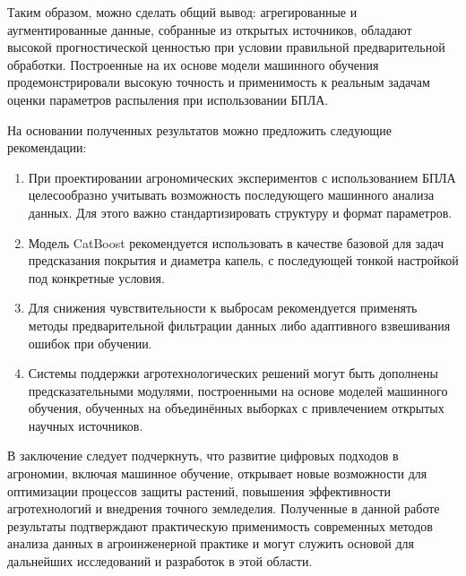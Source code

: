 Таким образом, можно сделать общий вывод: агрегированные и аугментированные данные, собранные из открытых источников, обладают высокой прогностической ценностью при условии правильной предварительной обработки. Построенные на их основе модели машинного обучения продемонстрировали высокую точность и применимость к реальным задачам оценки параметров распыления при использовании БПЛА.

На основании полученных результатов можно предложить следующие рекомендации:

\begin{enumerate}
\item При проектировании агрономических экспериментов с использованием БПЛА целесообразно учитывать возможность последующего машинного анализа данных. Для этого важно стандартизировать структуру и формат параметров.
\item Модель CatBoost рекомендуется использовать в качестве базовой для задач предсказания покрытия и диаметра капель, с последующей тонкой настройкой под конкретные условия.
\item Для снижения чувствительности к выбросам рекомендуется применять методы предварительной фильтрации данных либо адаптивного взвешивания ошибок при обучении.
\item Системы поддержки агротехнологических решений могут быть дополнены предсказательными модулями, построенными на основе моделей машинного обучения, обученных на объединённых выборках с привлечением открытых научных источников.
\end{enumerate}

В заключение следует подчеркнуть, что развитие цифровых подходов в агрономии, включая машинное обучение, открывает новые возможности для оптимизации процессов защиты растений, повышения эффективности агротехнологий и внедрения точного земледелия. Полученные в данной работе результаты подтверждают практическую применимость современных методов анализа данных в агроинженерной практике и могут служить основой для дальнейших исследований и разработок в этой области.

